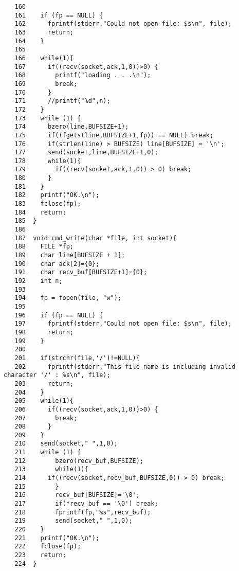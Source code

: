 \documentclass[a4paper,11pt]{jarticle}
\begin{document}
{\begin{verbatim}
   160	
   161	  if (fp == NULL) {
   162	    fprintf(stderr,"Could not open file: $s\n", file);
   163	    return;
   164	  }
   165	  
   166	  while(1){
   167	    if((recv(socket,ack,1,0))>0) {
   168	      printf("loading . . .\n");
   169	      break;
   170	    }
   171	    //printf("%d",n);
   172	  }
   173	  while (1) {
   174	    bzero(line,BUFSIZE+1);
   175	    if((fgets(line,BUFSIZE+1,fp)) == NULL) break;
   176	    if(strlen(line) > BUFSIZE) line[BUFSIZE] = '\n';
   177	    send(socket,line,BUFSIZE+1,0);
   178	    while(1){
   179	      if((recv(socket,ack,1,0)) > 0) break;
   180	    }
   181	  }
   182	  printf("OK.\n");
   183	  fclose(fp);
   184	  return;
   185	}  
   186	
   187	void cmd_write(char *file, int socket){
   188	  FILE *fp;
   189	  char line[BUFSIZE + 1];
   190	  char ack[2]={0};
   191	  char recv_buf[BUFSIZE+1]={0};
   192	  int n;
   193	  
   194	  fp = fopen(file, "w");
   195	
   196	  if (fp == NULL) {
   197	    fprintf(stderr,"Could not open file: $s\n", file);
   198	    return;
   199	  }
   200	
   201	  if(strchr(file,'/')!=NULL){
   202	    fprintf(stderr,"This file-name is including invalid character '/' : %s\n", file);
   203	    return;
   204	  }
   205	  while(1){
   206	    if((recv(socket,ack,1,0))>0) {
   207	      break;
   208	    }
   209	  }
   210	  send(socket," ",1,0);
   211	  while (1) {
   212	      bzero(recv_buf,BUFSIZE);
   213	      while(1){
   214		if((recv(socket,recv_buf,BUFSIZE,0)) > 0) break;
   215	      }
   216	      recv_buf[BUFSIZE]='\0';
   217	      if(*recv_buf == '\0') break;
   218	      fprintf(fp,"%s",recv_buf);
   219	      send(socket," ",1,0);
   220	  }
   221	  printf("OK.\n");
   222	  fclose(fp);
   223	  return;
   224	}  
\end{verbatim}
}
 
\end{document}
